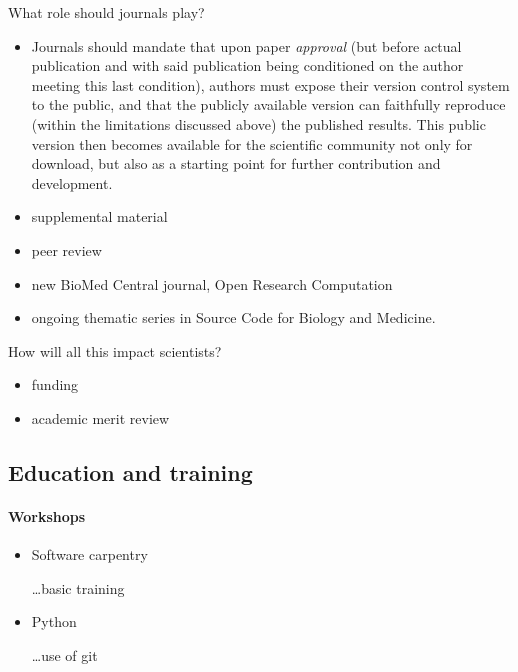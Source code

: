 \documentclass[ChapterTOCs,krantz2]{krantz} %
\begin{document}
What role should journals play?

\begin{itemize}
\item Journals should mandate that upon paper \emph{approval} (but before
actual publication and with said publication being conditioned on
the author meeting this last condition), authors must expose their
version control system to the public, and that the publicly available
version can faithfully reproduce (within the limitations discussed
above) the published results. This public version then becomes available
for the scientific community not only for download, but also as a
starting point for further contribution and development.

\item supplemental material

\item peer review

\item new BioMed Central journal, Open Research Computation

 \item ongoing thematic series in Source Code for Biology and Medicine.
\cite{neylon2012changing}

\end{itemize}

How will all this impact scientists?

\begin{itemize}

\item funding
\item academic merit review

\end{itemize}

\subsection{Education and training}

\paragraph{ {\bf Workshops}}

\begin{itemize}

\item Software carpentry

\ldots basic training

\item Python

\ldots use of git

\end{itemize}
\end{document}
